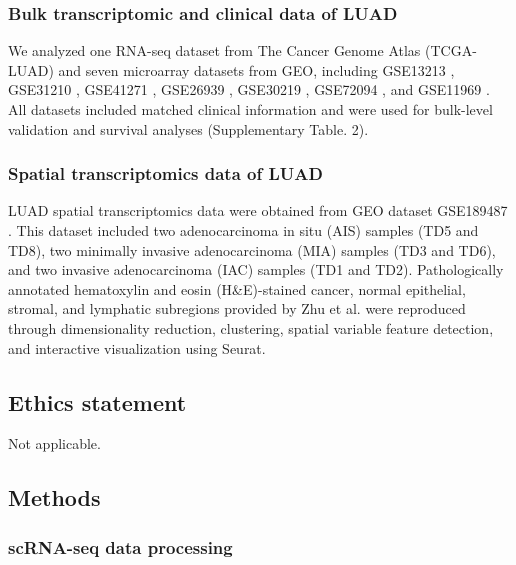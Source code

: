 \documentclass[pdflatex,sn-mathphys-num]{sn-jnl}%
\theoremstyle{thmstyleone}%
\theoremstyle{thmstyletwo}%
\theoremstyle{thmstylethree}%
\begin{document}
\subsubsection{Bulk transcriptomic and clinical data of LUAD}

We analyzed one RNA-seq dataset from The Cancer Genome Atlas (TCGA-LUAD) and seven microarray datasets from GEO, including GSE13213 \cite{bib22}, GSE31210 \cite{bib23}, GSE41271 \cite{bib24}, GSE26939 \cite{bib25}, GSE30219 \cite{bib26}, GSE72094 \cite{bib27}, and GSE11969 \cite{bib28}. All datasets included matched clinical information and were used for bulk-level validation and survival analyses (Supplementary Table. 2).

\subsubsection{Spatial transcriptomics data of LUAD}

LUAD spatial transcriptomics data were obtained from GEO dataset GSE189487 \cite{bib3}. This dataset included two adenocarcinoma in situ (AIS) samples (TD5 and TD8), two minimally invasive adenocarcinoma (MIA) samples (TD3 and TD6), and two invasive adenocarcinoma (IAC) samples (TD1 and TD2). Pathologically annotated hematoxylin and eosin (H\&E)-stained cancer, normal epithelial, stromal, and lymphatic subregions provided by Zhu et al. were reproduced through dimensionality reduction, clustering, spatial variable feature detection, and interactive visualization using Seurat.

\subsection{Ethics statement}

Not applicable.

\subsection{Methods}

\subsubsection{scRNA-seq data processing}
\end{document}
